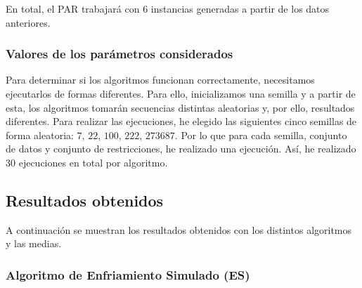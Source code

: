 En total, el PAR trabajará con 6 instancias generadas a partir de los datos anteriores.

\subsubsection{Valores de los parámetros considerados}

Para determinar si los algoritmos funcionan correctamente, necesitamos ejecutarlos de formas diferentes. Para ello, inicializamos 
una semilla y a partir de esta, los algoritmos tomarán secuencias distintas aleatorias y, por ello, resultados diferentes.
Para realizar las ejecuciones, he elegido las siguientes cinco semillas de forma aleatoria: $7$, $22$, $100$, $222$, $273687$.
Por lo que para cada semilla, conjunto de datos y conjunto de restricciones, he realizado una ejecución. Así, he realizado $30$ ejecuciones en total por algoritmo.

\subsection{Resultados obtenidos}

A continuación se muestran los resultados obtenidos con los distintos algoritmos y las medias.

\subsubsection{Algoritmo de Enfriamiento Simulado (ES)}


